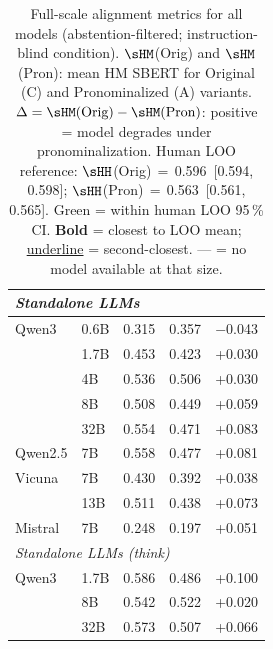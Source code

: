 \begin{table}[h]
\begin{tabular}{llccc}
\midrule
\multicolumn{5}{l}{\textit{Standalone LLMs}} \\
\midrule
Qwen3 & 0.6B & 0.315 & 0.357 & $-$0.043 \\
 & 1.7B & 0.453 & 0.423 & +0.030 \\
 & 4B & 0.536 & 0.506 & +0.030 \\
 & 8B & 0.508 & 0.449 & +0.059 \\
 & 32B & 0.554 & 0.471 & +0.083 \\
Qwen2.5 & 7B & 0.558 & 0.477 & +0.081 \\
Vicuna & 7B & 0.430 & 0.392 & +0.038 \\
 & 13B & 0.511 & 0.438 & +0.073 \\
Mistral & 7B & 0.248 & 0.197 & +0.051 \\
\midrule
\multicolumn{5}{l}{\textit{Standalone LLMs (think)}} \\
\midrule
Qwen3 & 1.7B & 0.586 & 0.486 & +0.100 \\
 & 8B & 0.542 & 0.522 & +0.020 \\
 & 32B & 0.573 & 0.507 & +0.066 \\
\bottomrule
\end{tabular}
\caption{Full-scale alignment metrics for all models (abstention-filtered; instruction-blind condition). $\sHM$(Orig) and $\sHM$(Pron): mean HM SBERT for Original (C) and Pronominalized (A) variants. $\Delta = \sHM(\text{Orig})-\sHM(\text{Pron})$: positive = model degrades under pronominalization. Human LOO reference: $\sHH$(Orig)\,$=$\,0.596\ [0.594, 0.598]; $\sHH$(Pron)\,$=$\,0.563\ [0.561, 0.565]. \colorbox{green!20}{Green} = within human LOO 95\,\% CI. \textbf{Bold} = closest to LOO mean; \underline{underline} = second-closest. {---} = no model available at that size.}
\label{tab:scale_alignment_full}
\end{table}
